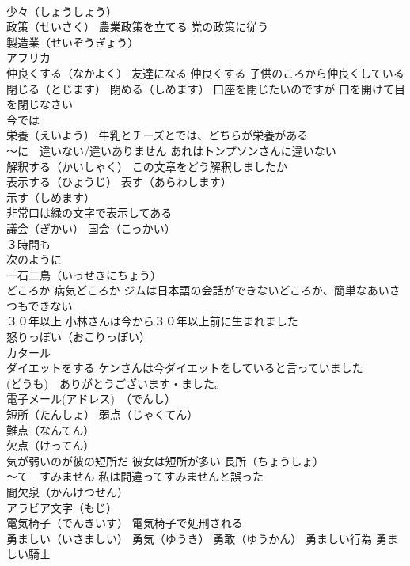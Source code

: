 \documentclass[8pt]{extreport}
\begin{document}
\begin{CJK}{UTF8}{min}
\\	少々（しょうしょう）
\\	政策（せいさく） 農業政策を立てる 党の政策に従う
\\	製造業（せいぞうぎょう）
\\	アフリカ
\\	仲良くする（なかよく） 友達になる 仲良くする 子供のころから仲良くしている
\\	閉じる（とじます） 閉める（しめます） 口座を閉じたいのですが 口を開けて目を閉じなさい
\\	今では
\\	栄養（えいよう） 牛乳とチーズとでは、どちらが栄養がある
\\	～に　違いない/違いありません あれはトンプソンさんに違いない
\\	解釈する（かいしゃく） この文章をどう解釈しましたか
\\	表示する（ひょうじ） 表す（あらわします）
\\	示す（しめます）
\\	非常口は緑の文字で表示してある
\\	議会（ぎかい） 国会（こっかい）
\\	３時間も
\\	次のように
\\	一石二鳥（いっせきにちょう） 
\\	どころか 病気どころか ジムは日本語の会話ができないどころか、簡単なあいさつもできない
\\	３０年以上 小林さんは今から３０年以上前に生まれました
\\	怒りっぽい（おこりっぽい）
\\	カタール
\\	ダイエットをする ケンさんは今ダイエットをしていると言っていました
\\	(どうも)　ありがとうございます・ました。
\\	電子メール(アドレス)　（でんし）
\\	短所（たんしょ） 弱点（じゃくてん）
\\	難点（なんてん）
\\	欠点（けってん）
\\	気が弱いのが彼の短所だ 彼女は短所が多い 長所（ちょうしょ）
\\	～て　すみません 私は間違ってすみませんと誤った
\\	間欠泉（かんけつせん）
\\	アラビア文字（もじ）
\\	電気椅子（でんきいす） 電気椅子で処刑される
\\	勇ましい（いさましい） 勇気（ゆうき） 勇敢（ゆうかん） 勇ましい行為 勇ましい騎士

\end{CJK}
\end{document}
